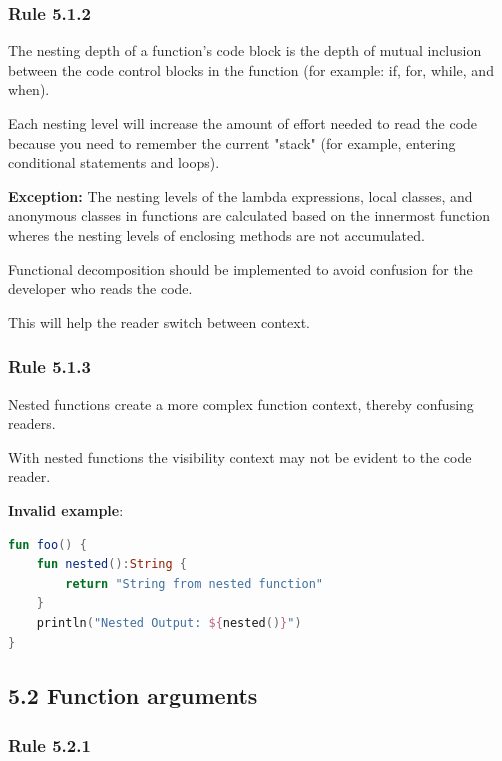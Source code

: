 {{{{\subsubsection*{\textbf{Rule 5.1.2}}
\leavevmode\newline



The nesting depth of a function's code block is the depth of mutual inclusion between the code control blocks in the function (for example: if, for, while, and when).

Each nesting level will increase the amount of effort needed to read the code because you need to remember the current "stack" (for example, entering conditional statements and loops).

\textbf{Exception:} The nesting levels of the lambda expressions, local classes, and anonymous classes in functions are calculated based on the innermost function wheres the nesting levels of enclosing methods are not accumulated.

Functional decomposition should be implemented to avoid confusion for the developer who reads the code.

This will help the reader switch between context.



\subsubsection*{\textbf{Rule 5.1.3}}
\leavevmode\newline

Nested functions create a more complex function context, thereby confusing readers.

With nested functions the visibility context may not be evident to the code reader.



\textbf{Invalid example}:

\begin{lstlisting}[language=Kotlin]
fun foo() {
    fun nested():String {
        return "String from nested function"
    }
    println("Nested Output: ${nested()}")
}
\end{lstlisting}


\subsection*{\textbf{5.2 Function arguments}}

\subsubsection*{\textbf{Rule 5.2.1}}
\leavevmode\newline



}}}}
